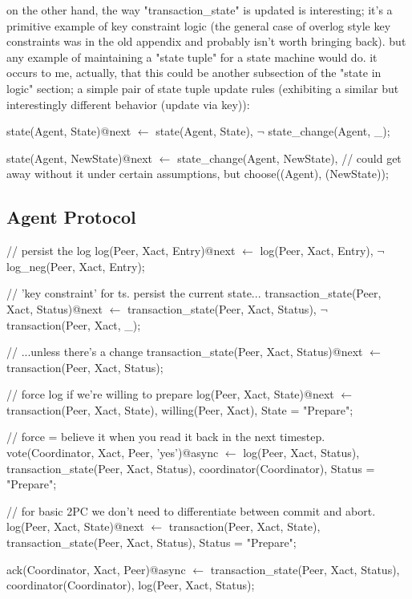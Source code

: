 on the other hand, the way "transaction\_state" is updated is interesting; it's a primitive example of key constraint logic (the general case of 
overlog style key constraints was in the old appendix and probably isn't worth bringing back).  but any example of maintaining a "state tuple" 
for a state machine would do.  it occurs to me, actually, that this could be another subsection of the "state in logic" section; a simple pair of state 
tuple update rules (exhibiting a similar but interestingly different behavior (update via key)):

\begin{Dedalus}
\small

state(Agent, State)@next \(\leftarrow\)
  state(Agent, State),
  \(\lnot\) state\_change(Agent, _);

state(Agent, NewState)@next \(\leftarrow\)
  state_change(Agent, NewState),
  // could get away without it under certain assumptions, but
  choose((Agent), (NewState));
\end{Dedalus}

\subsection{Agent Protocol}

\begin{Dedalus}
\small
// persist the log
log(Peer, Xact, Entry)@next \(\leftarrow\)
    log(Peer, Xact, Entry),
    \(\lnot\) log\_neg(Peer, Xact, Entry);

// 'key constraint' for ts.  persist the current state...
transaction_state(Peer, Xact, Status)@next \(\leftarrow\)
    transaction\_state(Peer, Xact, Status),
    \(\lnot\) transaction(Peer, Xact, _);

// ...unless there's a change
transaction_state(Peer, Xact, Status)@next \(\leftarrow\)
    transaction(Peer, Xact, Status);


// force log if we're willing to prepare
log(Peer, Xact, State)@next \(\leftarrow\)
    transaction(Peer, Xact, State),
    willing(Peer, Xact),
    State = "Prepare";

// force = believe it when you read it back in the next timestep.
vote(Coordinator, Xact, Peer, 'yes')@async \(\leftarrow\)
    log(Peer, Xact, Status),
    transaction_state(Peer, Xact, Status),
    coordinator(Coordinator),
    Status = "Prepare";


// for basic 2PC we don't need to differentiate between commit and abort.
log(Peer, Xact, State)@next \(\leftarrow\)
    transaction(Peer, Xact, State),
    transaction_state(Peer, Xact, Status),
    Status = "Prepare";


ack(Coordinator, Xact, Peer)@async \(\leftarrow\)
    transaction_state(Peer, Xact, Status),
    coordinator(Coordinator),
    log(Peer, Xact, Status);
   
   
\end{Dedalus}   


